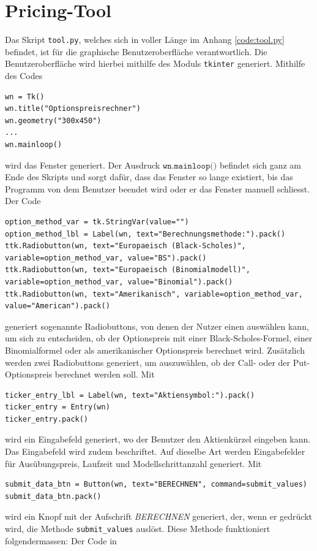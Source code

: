 \documentclass[11pt]{report} %
\begin{document}
\section{Pricing-Tool}
Das Skript \texttt{tool.py}, welches sich in voller Länge im Anhang \ref{code:tool.py} befindet, ist für die graphische Benutzeroberfläche verantwortlich. Die Benutzeroberfläche wird hierbei mithilfe des Moduls \texttt{tkinter} generiert. Mithilfe des Codes \begin{lstlisting}
wn = Tk()
wn.title("Optionspreisrechner")
wn.geometry("300x450")
...
wn.mainloop()
\end{lstlisting} wird das Fenster generiert. Der Ausdruck $\texttt{wn.mainloop()}$ befindet sich ganz am Ende des Skripts und sorgt dafür, dass das Fenster so lange existiert, bis das Programm von dem Benutzer beendet wird oder er das Fenster manuell schliesst. Der Code \begin{lstlisting}
option_method_var = tk.StringVar(value="")
option_method_lbl = Label(wn, text="Berechnungsmethode:").pack()
ttk.Radiobutton(wn, text="Europaeisch (Black-Scholes)", variable=option_method_var, value="BS").pack()
ttk.Radiobutton(wn, text="Europaeisch (Binomialmodell)", variable=option_method_var, value="Binomial").pack()
ttk.Radiobutton(wn, text="Amerikanisch", variable=option_method_var, value="American").pack()
\end{lstlisting} generiert sogenannte Radiobuttons, von denen der Nutzer einen auswählen kann, um sich zu entscheiden, ob der Optionspreis mit einer Black-Scholes-Formel, einer Binomialformel oder als amerikanischer Optionspreis berechnet wird. Zusätzlich werden zwei Radiobuttons generiert, um auszuwählen, ob der Call- oder der Put-Optionspreis berechnet werden soll. Mit \begin{lstlisting}
ticker_entry_lbl = Label(wn, text="Aktiensymbol:").pack()
ticker_entry = Entry(wn)
ticker_entry.pack()
\end{lstlisting} wird ein Eingabefeld generiert, wo der Benutzer den Aktienkürzel eingeben kann. Das Eingabefeld wird zudem beschriftet. Auf dieselbe Art werden Eingabefelder für Ausübungspreis, Laufzeit und Modellschrittanzahl generiert. Mit \begin{lstlisting}
submit_data_btn = Button(wn, text="BERECHNEN", command=submit_values)
submit_data_btn.pack()
\end{lstlisting} wird ein Knopf mit der Aufschrift \textit{BERECHNEN} generiert, der, wenn er gedrückt wird, die Methode \texttt{submit\_values} auslöst. Diese Methode funktioniert folgendermassen: Der Code in \begin{lstlisting}

\end{lstlisting}
\end{document}
